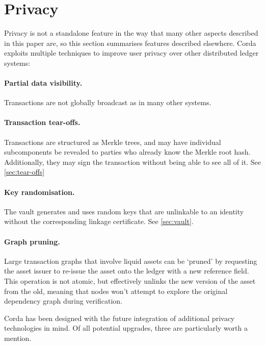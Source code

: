 \documentclass{article}
\begin{document}
\section{Privacy}\label{sec:privacy}

Privacy is not a standalone feature in the way that many other aspects described in this paper are, so this section
summarises features described elsewhere. Corda exploits multiple techniques to improve user privacy over other
distributed ledger systems:

\paragraph{Partial data visibility.}Transactions are not globally broadcast as in many other systems.
\paragraph{Transaction tear-offs.}Transactions are structured as Merkle trees, and may have individual subcomponents be
revealed to parties who already know the Merkle root hash. Additionally, they may sign the transaction without being
able to see all of it. See \cref{sec:tear-offs}
\paragraph{Key randomisation.}The vault generates and uses random keys that are unlinkable to an identity without the
corresponding linkage certificate. See \cref{sec:vault}.
\paragraph{Graph pruning.}Large transaction graphs that involve liquid assets can be `pruned' by requesting the asset
issuer to re-issue the asset onto the ledger with a new reference field. This operation is not atomic, but effectively
unlinks the new version of the asset from the old, meaning that nodes won't attempt to explore the original dependency
graph during verification.

Corda has been designed with the future integration of additional privacy technologies in mind. Of all potential
upgrades, three are particularly worth a mention.
\end{document}
